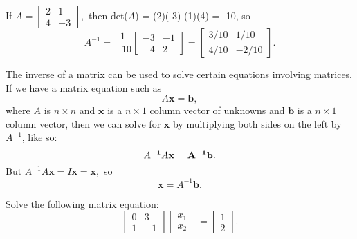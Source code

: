 \documentclass[12pt]{article}
\begin{document}
\example
If 
$A = \left[ \begin{array}{cc}  2 & 1 \\ 4 & -3  \end{array} \right],$
 then det($A$) = (2)(-3)-(1)(4) = -10,
 so $$A^{-1} = \frac{1}{-10} 
  \left[ \begin{array}{cc}  -3 & -1 \\ -4 & 2  \end{array} \right]
  =  \left[ \begin{array}{cc}  3/10 & 1/10 \\ 4/10 & -2/10 \end{array} \right].$$

\bigskip

The inverse of a matrix can be used to solve certain equations involving
matrices.  If we have a matrix equation such as $$A\mathbf{x} = \mathbf{b},$$
where $A$ is $n \times n$ and $\mathbf{x}$ is a $n \times 1$ column vector of unknowns
and $\mathbf{b}$ is a $n \times 1$ column vector, then we can solve for
$\mathbf{x}$
by multiplying both sides on the left by $A^{-1}$, like so:
$$A^{-1}A\bf{x} = A^{-1}\mathbf{b}.$$
But $A^{-1}A\mathbf{x} = I\mathbf{x} = \mathbf{x},$ so $$\mathbf{x} = A^{-1}\mathbf{b}.$$

\example
Solve the following matrix equation:
$$\left[ \begin{array}{cc}  0 & 3 \\ 1 & -1  \end{array} \right]
 \left[ \begin{array}{c} x_1 \\ x_2 \end{array} \right]
= \left[ \begin{array}{c} 1 \\ 2 \end{array} \right].$$
\end{document}
